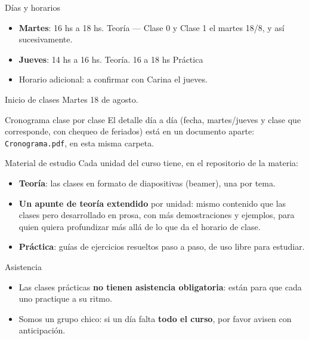 \documentclass[aspectratio=169,11pt]{beamer}
\begin{document}
\begin{frame}{Días y horarios}
\begin{itemize}
\item \textbf{Martes}: 16 hs a 18 hs. Teoría — Clase 0 y Clase 1 el martes 18/8, y así sucesivamente.
\item \textbf{Jueves}: 14 hs a 16 hs. Teoría. 16 a 18 hs Práctica
\item Horario adicional: a confirmar con Carina el jueves.
\end{itemize}
\vspace{1em}
\begin{alertblock}{Inicio de clases}
Martes 18 de agosto.
\end{alertblock}
\begin{block}{Cronograma clase por clase}
El detalle día a día (fecha, martes/jueves y clase que corresponde, con chequeo de feriados) está en un documento aparte: \texttt{Cronograma.pdf}, en esta misma carpeta.
\end{block}
\end{frame}

\begin{frame}{Material de estudio}
Cada unidad del curso tiene, en el repositorio de la materia:
\begin{itemize}
\item \textbf{Teoría}: las clases en formato de diapositivas (beamer), una por tema.
\item \textbf{Un apunte de teoría extendido} por unidad: mismo contenido que las clases pero desarrollado en prosa, con más demostraciones y ejemplos, para quien quiera profundizar más allá de lo que da el horario de clase.
\item \textbf{Práctica}: guías de ejercicios resueltos paso a paso, de uso libre para estudiar.
\end{itemize}
\end{frame}

\begin{frame}{Asistencia}
\begin{itemize}
\item Las clases prácticas \textbf{no tienen asistencia obligatoria}: están para que cada uno practique a su ritmo.
\item Somos un grupo chico: si un día falta \textbf{todo el curso}, por favor avisen con anticipación.
\end{itemize}
\end{frame}

\end{document}
